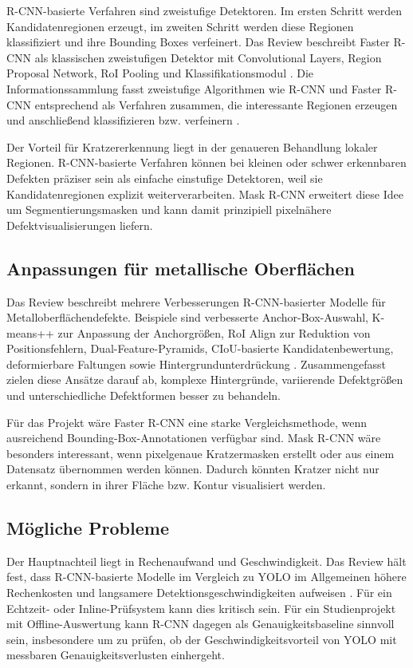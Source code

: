\documentclass[11pt,a4paper]{article}
\begin{document}
R-CNN-basierte Verfahren sind zweistufige Detektoren. Im ersten Schritt werden Kandidatenregionen erzeugt, im zweiten Schritt werden diese Regionen klassifiziert und ihre Bounding Boxes verfeinert. Das Review beschreibt Faster R-CNN als klassischen zweistufigen Detektor mit Convolutional Layers, Region Proposal Network, RoI Pooling und Klassifikationsmodul \cite{applications_review}. Die Informationssammlung fasst zweistufige Algorithmen wie R-CNN und Faster R-CNN entsprechend als Verfahren zusammen, die interessante Regionen erzeugen und anschließend klassifizieren bzw. verfeinern \cite{ersteinfos}.

Der Vorteil für Kratzererkennung liegt in der genaueren Behandlung lokaler Regionen. R-CNN-basierte Verfahren können bei kleinen oder schwer erkennbaren Defekten präziser sein als einfache einstufige Detektoren, weil sie Kandidatenregionen explizit weiterverarbeiten. Mask R-CNN erweitert diese Idee um Segmentierungsmasken und kann damit prinzipiell pixelnähere Defektvisualisierungen liefern.

\subsection{Anpassungen für metallische Oberflächen}

Das Review beschreibt mehrere Verbesserungen R-CNN-basierter Modelle für Metalloberflächendefekte. Beispiele sind verbesserte Anchor-Box-Auswahl, K-means++ zur Anpassung der Anchorgrößen, RoI Align zur Reduktion von Positionsfehlern, Dual-Feature-Pyramids, CIoU-basierte Kandidatenbewertung, deformierbare Faltungen sowie Hintergrundunterdrückung \cite{applications_review}. Zusammengefasst zielen diese Ansätze darauf ab, komplexe Hintergründe, variierende Defektgrößen und unterschiedliche Defektformen besser zu behandeln.

Für das Projekt wäre Faster R-CNN eine starke Vergleichsmethode, wenn ausreichend Bounding-Box-Annotationen verfügbar sind. Mask R-CNN wäre besonders interessant, wenn pixelgenaue Kratzermasken erstellt oder aus einem Datensatz übernommen werden können. Dadurch könnten Kratzer nicht nur erkannt, sondern in ihrer Fläche bzw. Kontur visualisiert werden.

\subsection{Mögliche Probleme}

Der Hauptnachteil liegt in Rechenaufwand und Geschwindigkeit. Das Review hält fest, dass R-CNN-basierte Modelle im Vergleich zu YOLO im Allgemeinen höhere Rechenkosten und langsamere Detektionsgeschwindigkeiten aufweisen \cite{applications_review}. Für ein Echtzeit- oder Inline-Prüfsystem kann dies kritisch sein. Für ein Studienprojekt mit Offline-Auswertung kann R-CNN dagegen als Genauigkeitsbaseline sinnvoll sein, insbesondere um zu prüfen, ob der Geschwindigkeitsvorteil von YOLO mit messbaren Genauigkeitsverlusten einhergeht.
\end{document}
